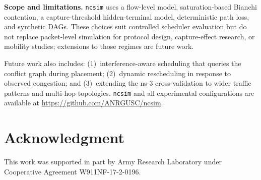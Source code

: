 \documentclass[conference]{IEEEtran}
\newcommand{\ncsim}{\texttt{ncsim}}
\begin{document}
\textbf{Scope and limitations.}  \ncsim{} uses a flow-level model,
saturation-based Bianchi contention, a capture-threshold hidden-terminal
model, deterministic path loss, and synthetic DAGs.  These choices suit
controlled scheduler evaluation but do not replace packet-level
simulation for protocol design, capture-effect research, or mobility
studies; extensions to those regimes are future work.

Future work also includes: (1)~interference-aware scheduling that
queries the conflict graph during placement; (2)~dynamic rescheduling
in response to observed congestion; and (3)~extending the ns-3
cross-validation to wider traffic patterns and multi-hop topologies.
\ncsim{} and all experimental configurations are available at
\url{https://github.com/ANRGUSC/ncsim}.


\section*{Acknowledgment}
This work was supported in part by Army Research Laboratory under Cooperative Agreement W911NF-17-2-0196.
\end{document}
